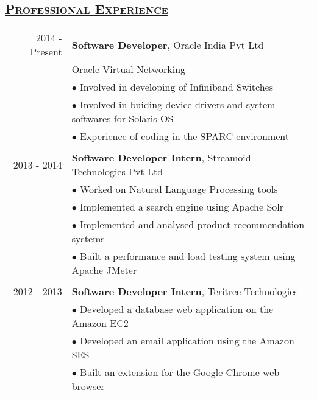 \documentclass[14pt]{article}
\begin{document}
\subsection* {\scshape\LARGE\uline {Professional Experience}}
\large
\begin{tabular}{r l}
2014 - Present & \textbf{Software Developer}, Oracle India Pvt Ltd \\
		          & Oracle Virtual Networking\\ 
			   & $\bullet$ Involved in developing of Infiniband Switches\\
			   & $\bullet$ Involved in buiding device drivers and system softwares for  Solaris OS\\
			   & $\bullet$ Experience of coding in the SPARC environment	    
\\ \\

2013 - 2014 & \textbf{Software Developer Intern}, Streamoid Technologies Pvt Ltd \\ 
			& $\bullet$ Worked on Natural Language Processing tools \\
			& $\bullet$ Implemented a search engine using Apache Solr \\		    			& $\bullet$ Implemented and analysed product recommendation systems \\
			& $\bullet$ Built a performance and load testing system using Apache JMeter
\\ \\

2012 - 2013 & \textbf{Software Developer Intern}, Teritree Technologies \\ 
			& $\bullet$ Developed a database web application on the Amazon EC2 \\
			& $\bullet$ Developed an email application using the Amazon SES\\
			& $\bullet$ Built an extension for the Google Chrome web browser	    
\end{tabular}
\end{document}
